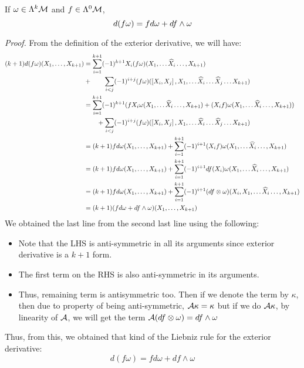 \begin{lemma}
   If $\omega\in\Lambda^k\mathcal M$ and $f\in \Lambda^0\mathcal M$, 
   $$d(f\omega) = fd\omega + df \wedge \omega$$
\end{lemma}
\textit{Proof.} From the definition of the exterior derivative, we will have:
\begin{align*}
    (k+1)d(f\omega) (X_1,\ldots,X_{k+1})&= \sum\limits_{i=1}^{k+1} (-1)^{k+1}X_i (f\omega)(X_1,\ldots \widehat{X}_i\ldots, X_{k+1})\\
    &+\qquad \sum\limits_{i<j} (-1)^{i+j}(f\omega)(\left[ X_i, X_j \right], X_1,\ldots \widehat{X}_i\ldots \widehat{X}_j\ldots X_{k+1})\\
    &=\sum\limits_{i=1}^{k+1} (-1)^{k+1} (fX_i\omega(X_1,\ldots \widehat{X}_i\ldots, X_{k+1}) + (X_if)\omega(X_1,\ldots \widehat{X}_i\ldots, X_{k+1}))\\
    &\qquad +\sum\limits_{i<j} (-1)^{i+j}(f\omega)(\left[ X_i, X_j \right], X_1,\ldots \widehat{X}_i\ldots \widehat{X}_j\ldots X_{k+1})\\
    &=(k+1)fd\omega(X_1,\ldots, X_{k+1}) +\sum\limits_{i=1}^{k+1}(-1)^{i+1}(X_if)\omega(X_1,\ldots \widehat{X}_i\ldots, X_{k+1})\\
    &=(k+1)fd\omega(X_1,\ldots, X_{k+1}) +\sum\limits_{i=1}^{k+1}(-1)^{i+1}df(X_i)\omega(X_1,\ldots \widehat{X}_i\ldots, X_{k+1})\\
    &=(k+1)fd\omega(X_1,\ldots, X_{k+1}) +\sum\limits_{i=1}^{k+1}(-1)^{i+1}(df\otimes\omega)(X_i,X_1,\ldots \widehat{X}_i\ldots, X_{k+1})\\
    &=(k+1)(fd\omega + df \wedge \omega)(X_1,\ldots, X_{k+1}) 
\end{align*}
We obtained the last line from the second last line using the following:
\begin{itemize}
    \item Note that the LHS is anti-symmetric in all its arguments since exterior derivative is a $k+1$ form. 
    \item The first term on the RHS is also anti-symmetric in its arguments. 
    \item Thus, remaining term is antisymmetric too. Then if we denote the term by $\kappa$, then due to property of being anti-symmetric, $\mathcal A\kappa = \kappa$ but if we do $\mathcal A\kappa$, by linearity of $\mathcal A$, we will get the term $\mathcal A(df\otimes\omega) = df\wedge \omega$
\end{itemize}
Thus, from this, we obtained that kind of the Liebniz rule for the exterior derivative:
$$d(f\omega) = fd\omega + df\wedge \omega$$\\
